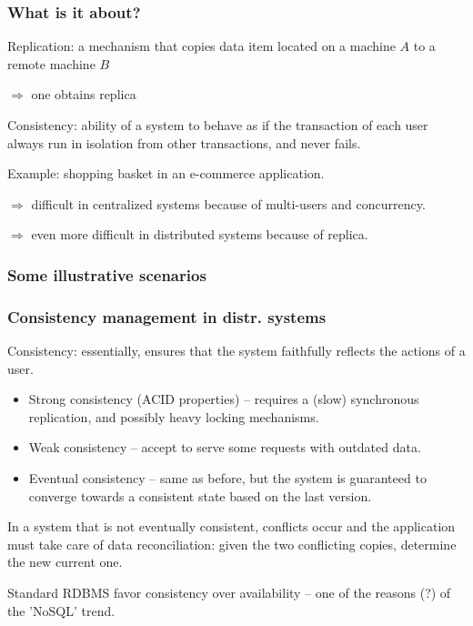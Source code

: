\documentclass{beamer}
\begin{document}
\begin{frame}
\frametitle{What is it about?}

\alert{Replication}: a mechanism that copies data item located on a machine
$A$ to a remote machine $B$

\vfill

$\Rightarrow$ one obtains \alert{replica}

\vfill

\alert{Consistency}: ability of a system to behave as if the transaction of each
      user always run in isolation from other transactions, and never fails.

\vfill
 Example: shopping basket in an e-commerce application.
\vfill

$\Rightarrow$ difficult in centralized systems because of multi-users and
concurrency.

\vfill

$\Rightarrow$ even more difficult in distributed  systems because of 
replica.

\end{frame}

\begin{frame}
\frametitle{Some illustrative scenarios}


\end{frame}



\begin{frame}
\frametitle{Consistency management in distr. systems}

\alert{Consistency}: essentially, ensures that the system faithfully reflects
the actions of a user.
\begin{itemize}
  \item \alert{Strong consistency} (ACID properties) --  requires a
  (slow) synchronous replication, and possibly heavy locking mechanisms.
  \item \alert{Weak consistency} -- accept to serve some requests with outdated
  data.
  \item \alert{Eventual consistency} -- same as before, but the system is
  guaranteed to converge towards a consistent state based on the last version.
\end{itemize}

\vfill

In a system that is not eventually consistent, \alert{conflicts} occur
and the application must take care of \alert{data reconciliation}: given the two
conflicting copies, determine the new current one.

\vfill

Standard RDBMS favor consistency over availability -- one of the reasons (?) of
the 'NoSQL' trend.

\end{frame}
\end{document}
